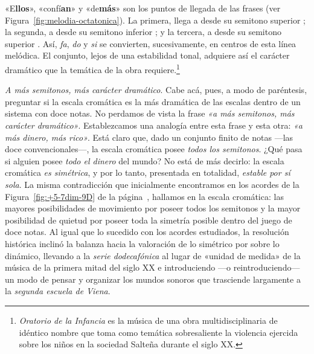 \documentclass[a4paper,12pt]{article}
\begin{document}
\begin{multicols}{2}
«E\textbf{llos}», «confí\textbf{an}» y «de\textbf{más}» son los puntos de llegada de las frases (ver Figura~\ref{fig:melodia-octatonica}). La primera, llega a  desde su semitono superior \hbox{;} la segunda, a  desde su semitono inferior \hbox{;} y la tercera, a  desde su semitono superior \hbox{.} Así, \emph{fa}, \emph{do} y \emph{si} se convierten, sucesivamente, en centros de esta línea melódica. El conjunto, lejos de una estabilidad tonal, adquiere así el carácter dramático que la temática de la obra requiere.\footnote{\emph{Oratorio de la Infancia} es la música de una obra multidisciplinaria de idéntico nombre que toma como temática sobresaliente la violencia ejercida sobre los niños en la sociedad Salteña durante el siglo XX.}

\emph{A más semitonos, más carácter dramático}. Cabe acá, pues, a modo de paréntesis, preguntar si la escala cromática es la más dramática de las escalas dentro de un sistema con doce notas. No perdamos de vista la frase \emph{«a más semitonos, más carácter dramático»}. Establezcamos una analogía entre esta frase y esta otra: \emph{«a más dinero, más rico»}. Está claro que, dado un conjunto finito de notas ---las doce convencionales---, la escala cromática posee \emph{todos los semitonos}. ¿Qué pasa si alguien posee \emph{todo el dinero} del mundo? No está de más decirlo: la escala cromática \emph{es simétrica}, y por lo tanto, presentada en totalidad, \emph{estable por sí sola}. La misma contradicción que inicialmente encontramos en los acordes de la Figura~\ref{fig:+5-7dim-9D} de la página~\pageref{fig:+5-7dim-9D}, hallamos en la escala cromática: las mayores posibilidades de movimiento por poseer todos los semitonos y la mayor posibilidad de quietud por poseer toda la simetría posible dentro del juego de doce notas. Al igual que lo sucedido con los acordes estudiados, la resolución histórica inclinó la balanza hacia la valoración de lo simétrico por sobre lo dinámico, llevando a la \emph{serie dodecafónica} al lugar de «unidad de medida» de la música de la primera mitad del siglo XX e introduciendo ---o reintroduciendo--- un modo de pensar y organizar los mundos sonoros que trasciende largamente a la \emph{segunda escuela de Viena}.
\end{multicols}
\end{document}
